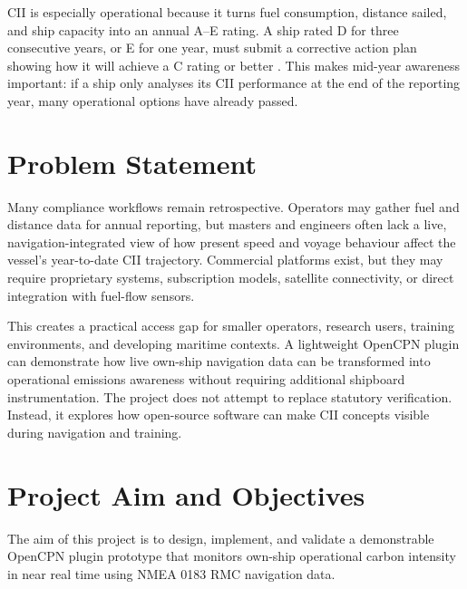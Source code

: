 CII is especially operational because it turns fuel consumption, distance sailed, and ship capacity into an annual A--E rating. A ship rated D for three consecutive years, or E for one year, must submit a corrective action plan showing how it will achieve a C rating or better \cite{imoEexiCiiFaq2026}. This makes mid-year awareness important: if a ship only analyses its CII performance at the end of the reporting year, many operational options have already passed.

\section{Problem Statement}
Many compliance workflows remain retrospective. Operators may gather fuel and distance data for annual reporting, but masters and engineers often lack a live, navigation-integrated view of how present speed and voyage behaviour affect the vessel's year-to-date CII trajectory. Commercial platforms exist, but they may require proprietary systems, subscription models, satellite connectivity, or direct integration with fuel-flow sensors.

This creates a practical access gap for smaller operators, research users, training environments, and developing maritime contexts. A lightweight OpenCPN plugin can demonstrate how live own-ship navigation data can be transformed into operational emissions awareness without requiring additional shipboard instrumentation. The project does not attempt to replace statutory verification. Instead, it explores how open-source software can make CII concepts visible during navigation and training.

\section{Project Aim and Objectives}
The aim of this project is to design, implement, and validate a demonstrable OpenCPN plugin prototype that monitors own-ship operational carbon intensity in near real time using NMEA 0183 RMC navigation data.

